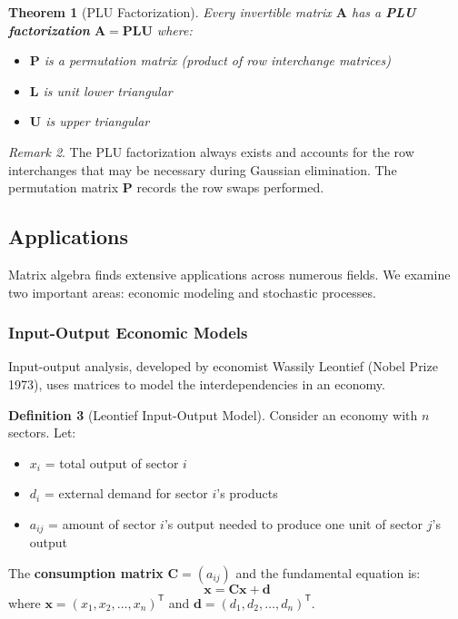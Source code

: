 \documentclass[12pt]{article}
\numberwithin{equation}{section}
\newcommand{\vect}[1]{\boldsymbol{#1}}   %
\newcommand{\mat}[1]{\mathbf{#1}}        %
\newcommand{\trans}{\mathsf{T}}          %
\theoremstyle{plain}
\newtheorem{theorem}{Theorem}[section]
\theoremstyle{definition}
\newtheorem{definition}[theorem]{Definition}
\theoremstyle{remark}
\newtheorem{remark}[theorem]{Remark}
\begin{document}
\begin{theorem}[PLU Factorization]
Every invertible matrix $\mat{A}$ has a \textbf{PLU factorization} $\mat{A} = \mat{P}\mat{L}\mat{U}$ where:
\begin{itemize}
\item $\mat{P}$ is a permutation matrix (product of row interchange matrices)
\item $\mat{L}$ is unit lower triangular
\item $\mat{U}$ is upper triangular
\end{itemize}
\end{theorem}

\begin{remark}
The PLU factorization always exists and accounts for the row interchanges that may be necessary during Gaussian elimination. The permutation matrix $\mat{P}$ records the row swaps performed.
\end{remark}

\subsection{Applications}

Matrix algebra finds extensive applications across numerous fields. We examine two important areas: economic modeling and stochastic processes.

\subsubsection{Input-Output Economic Models}

Input-output analysis, developed by economist Wassily Leontief (Nobel Prize 1973), uses matrices to model the interdependencies in an economy.

\begin{definition}[Leontief Input-Output Model]
Consider an economy with $n$ sectors. Let:
\begin{itemize}
\item $x_i$ = total output of sector $i$
\item $d_i$ = external demand for sector $i$'s products
\item $a_{ij}$ = amount of sector $i$'s output needed to produce one unit of sector $j$'s output
\end{itemize}

The \textbf{consumption matrix} $\mat{C} = (a_{ij})$ and the fundamental equation is:
$$\vect{x} = \mat{C}\vect{x} + \vect{d}$$
where $\vect{x} = (x_1, x_2, \ldots, x_n)^{\trans}$ and $\vect{d} = (d_1, d_2, \ldots, d_n)^{\trans}$.
\end{definition}
\end{document}
